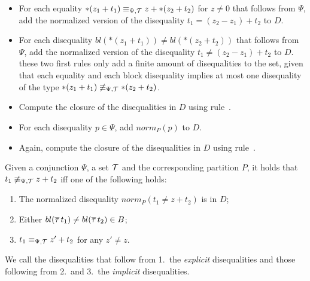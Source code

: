 
\begin{itemize}
    \item For each equality $*(z_1 + t_1) \equiv_{\Psi,\mathcal{T}} z + *(z_2 + t_2)$ for $z \neq 0$
    that follows from $\Psi$,
    add the normalized version of the disequality $t_1 = (z_2 - z_1) + t_2$ to $D$.
    \item For each disequality $bl(*(z_1 + t_1)) \neq bl(*(z_2 + t_2))$ that follows from $\Psi$, add the normalized version of the disequality $t_1 \neq (z_2 - z_1) + t_2$ to $D$.
    these two first rules only add a finite amount of disequalities to the set, given that each equality and each block disequality implies at most one disequality of the type $*(z_1 + t_1) \not\equiv_{\Psi,\mathcal{T}} *(z_2 + t_2)$.
    \item Compute the closure of the disequalities in $D$ using rule~.
    \item For each disequality $p \in \Psi$, add $norm_P(p)$ to $D$.
    \item Again, compute the closure of the disequalities in $D$ using rule~.
\end{itemize}

Given a conjunction $\Psi$, a set $\mathcal{T}$ and the corresponding partition $P$,
it holds that $t_1 \not\equiv_{\Psi,\mathcal{T}} z + t_2$ iff one of the following holds:

\begin{enumerate}
    \item The normalized disequality $norm_P(t_1 \neq z + t_2)$ is in $D$;
    \item Either $bl(\overline{\tau}\,t_1) \neq bl(\overline{\tau}\,t_2) \in B$;
    \item $t_1 \equiv_{\Psi,\mathcal{T}} z' + t_2$ for any $z' \neq z$.
\end{enumerate}
We call the disequalities that follow from 1.\ the \emph{explicit} disequalities and those following from 2.\ and 3.\ the \emph{implicit} disequalities.
